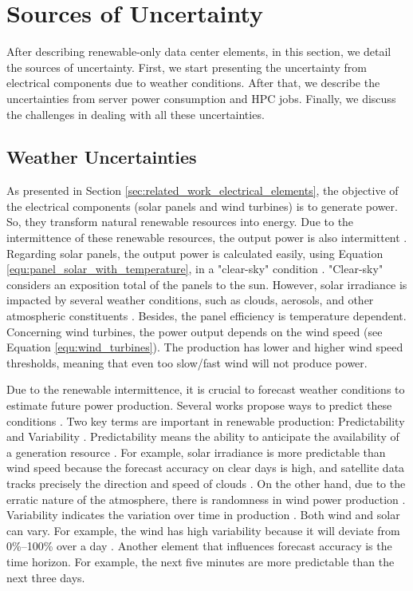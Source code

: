 \section{Sources of Uncertainty}

After describing renewable-only data center elements, in this section, we detail the sources of uncertainty. First, we start presenting the uncertainty from electrical components due to weather conditions. After that, we describe the uncertainties from server power consumption and HPC jobs. Finally, we discuss the challenges in dealing with all these uncertainties.

\subsection{Weather Uncertainties}
\label{sec:weather_uncertainties}

As presented in Section \ref{sec:related_work_electrical_elements}, the objective of the electrical components (solar panels and wind turbines) is to generate power. So, they transform natural renewable resources into energy. Due to the intermittence of these renewable resources, the output power is also intermittent \cite{perez2011managing}. Regarding solar panels, the output power is calculated easily, using Equation \ref{equ:panel_solar_with_temperature}, in a "clear-sky" condition \cite{tuohy2015solar}. "Clear-sky" considers an exposition total of the panels to the sun. However, solar irradiance is impacted by several weather conditions, such as clouds, aerosols, and other atmospheric constituents \cite{tuohy2015solar}. Besides, the panel efficiency is temperature dependent. Concerning wind turbines, the power output depends on the wind speed (see Equation \ref{equ:wind_turbines}). The production has lower and higher wind speed thresholds, meaning that even too slow/fast wind will not produce power. 

Due to the renewable intermittence, it is crucial to forecast weather conditions to estimate future power production. Several works propose ways to predict these conditions \cite{tuohy2015solar, soman2010review, sharma2018review, ssekulima2016wind}. Two key terms are important in renewable production: Predictability and Variability \cite{ssekulima2016wind, perez2011managing}. Predictability means the ability to anticipate the availability of a generation resource \cite{perez2011managing}. For example, solar irradiance is more predictable than wind speed because the forecast accuracy on clear days is high, and satellite data tracks precisely the direction and speed of clouds \cite{perez2011managing}. On the other hand, due to the erratic nature of the atmosphere, there is randomness in wind power production \cite{sharma2018review}. Variability indicates the variation over time in production \cite{perez2011managing}. Both wind and solar can vary. For example, the wind has high variability because it will deviate from 0\%–100\% over a day \cite{perez2011managing}. Another element that influences forecast accuracy is the time horizon. For example, the next five minutes are more predictable than the next three days.

